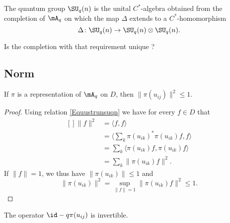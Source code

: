 The quantum group $\SU_q(n)$ is the unital $C^*$-algebra obtained from the completion of $\mA_q$ on which the map $\Delta$ extends to a $C^*$-homomorphism
\begin{equation}
    \Delta\colon \SU_q(n)\to \SU_q(n)\otimes\SU_q(n).
\end{equation}

\begin{probleme}
    Is the completion with that requirement unique ?
\end{probleme}

\subsection{Norm}

\begin{proposition}     \label{Propqpiideinve}
    If $\pi$ is a representation of $\mA_q$ on $D$, then $\| \pi(u_{ij}) \|^2\leq 1$.
\end{proposition}

\begin{proof}
    Using relation \eqref{Equustrunsuqn} we have for every $f\in D$ that
    \begin{equation}
        \begin{aligned}[]
            \| f \|^2&=\langle f, f\rangle \\
            &=\langle \sum_k\pi(u_{ik})^*\pi(u_{ik})f, f\rangle \\
            &=\sum_k\langle \pi(u_{ik})f, \pi(u_{ik})f\rangle \\
            &=\sum_k\| \pi(u_{ik})f \|^2.
        \end{aligned}
    \end{equation}
    If $\| f \|=1$, we thus have $\| \pi(u_{ik}) \|\leq 1$ and
    \begin{equation}
        \| \pi(u_{ik}) \|^2=\sup_{\| f \|=1}\| \pi(u_{ik})f \|^2\leq 1.
    \end{equation}
\end{proof}

\begin{corollary}       \label{CorOpOdquijInverti}
    The operator $\id-q\pi(u_{ij})$ is invertible.
\end{corollary}

